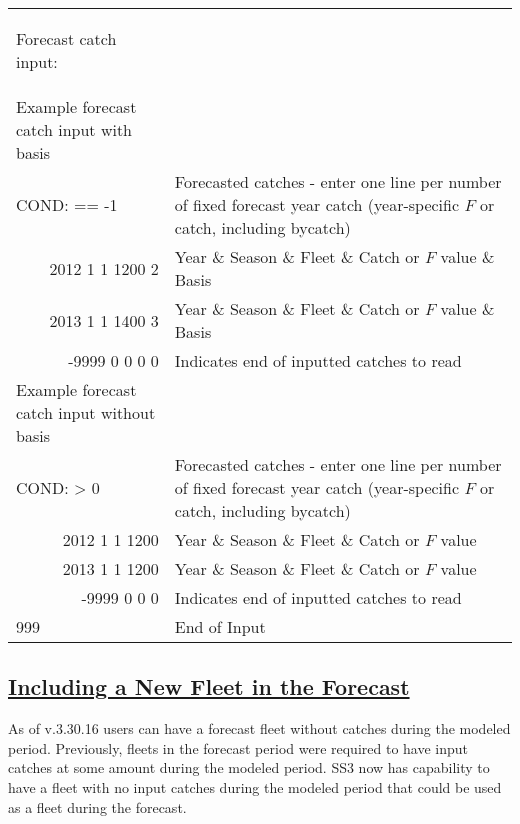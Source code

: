 \begin{landscape}
{\begin{longtable}{p{2cm} p{7cm} p{12cm}}
  \pagebreak
  \hypertarget{ForecastCatchInput}{Forecast catch input:} & \\
  Example forecast catch input with basis & \\
  \multicolumn{1}{l}{COND: == -1} & \multicolumn{2}{l}{Forecasted catches - enter one line per number of fixed forecast year catch (year-specific $F$ or catch, including bycatch)} \Tstrut\\
  \multicolumn{1}{r}{2012 1 1 1200 2} & \multicolumn{2}{l}{Year \& Season \& Fleet \& Catch or $F$ value \& Basis} \\
  \multicolumn{1}{r}{2013 1 1 1400 3} & \multicolumn{2}{l}{Year \& Season \& Fleet \& Catch or $F$ value \& Basis} \\
  \multicolumn{1}{r}{-9999 0 0 0 0} & \multicolumn{2}{l}{Indicates end of inputted catches to read} \Bstrut\\

  Example forecast catch input without basis & \\
  \multicolumn{1}{l}{COND: > 0} & \multicolumn{2}{l}{Forecasted catches - enter one line per number of fixed forecast year catch (year-specific $F$ or catch, including bycatch)} \Tstrut\\
  \multicolumn{1}{r}{2012 1 1 1200} & \multicolumn{2}{l}{Year \& Season \& Fleet \& Catch or $F$ value} \\
  \multicolumn{1}{r}{2013 1 1 1200} & \multicolumn{2}{l}{Year \& Season \& Fleet \& Catch or $F$ value} \\
  \multicolumn{1}{r}{-9999 0 0 0} & \multicolumn{2}{l}{Indicates end of inputted catches to read} \Bstrut\\

  \hline
  999 & End of Input & \Bstrut\\

  \end{longtable}}
\end{landscape}

\hypertarget{NewFleetForecast}{}
\subsection[Including a New Fleet in the Forecast]{\protect\hyperlink{NewFleetForecast}{Including a New Fleet in the Forecast}}
As of v.3.30.16 users can have a forecast fleet without catches during the modeled period. Previously, fleets in the forecast period were required to have input catches at some amount during the modeled period. SS3 now has capability to have a fleet with no input catches during the modeled period that could be used as a fleet during the forecast.

